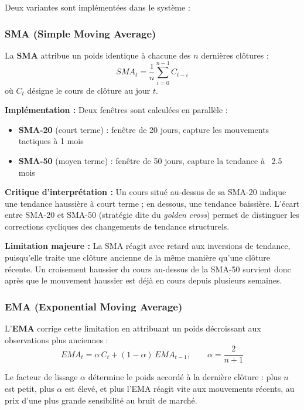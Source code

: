 \documentclass{rapportENSIAS} %
\begin{document}
\vspace{0.2cm}
\noindent
Deux variantes sont implémentées dans le système :

\subsubsection*{SMA (Simple Moving Average)}

\noindent
La \textbf{SMA} attribue un poids identique à chacune des $n$ dernières clôtures :
\[
SMA_t = \frac{1}{n}\sum_{i=0}^{n-1} C_{t-i}
\]
où $C_t$ désigne le cours de clôture au jour $t$.

\vspace{0.2cm}
\noindent
\textbf{Implémentation :} Deux fenêtres sont calculées en parallèle :
\begin{itemize}
    \item \textbf{SMA-20} (court terme) : fenêtre de 20 jours, capture les mouvements tactiques à 1 mois
    \item \textbf{SMA-50} (moyen terme) : fenêtre de 50 jours, capture la tendance à ~2.5 mois
\end{itemize}

\vspace{0.2cm}
\noindent
\textbf{Critique d'interprétation :} Un cours situé au-dessus de sa SMA-20 indique une tendance haussière à court terme ; en dessous, une tendance baissière. L'écart entre SMA-20 et SMA-50 (stratégie dite du \textit{golden cross}) permet de distinguer les corrections cycliques des changements de tendance structurels.

\vspace{0.2cm}
\noindent
\textbf{Limitation majeure :} La SMA réagit avec retard aux inversions de tendance, puisqu'elle traite une clôture ancienne de la même manière qu'une clôture récente. Un croisement haussier du cours au-dessus de la SMA-50 survient donc après que le mouvement haussier est déjà en cours depuis plusieurs semaines.

\subsubsection*{EMA (Exponential Moving Average)}

\noindent
L'\textbf{EMA} corrige cette limitation en attribuant un poids décroissant aux observations plus anciennes :
\[
EMA_t = \alpha\, C_t + (1-\alpha)\, EMA_{t-1}, \qquad \alpha = \frac{2}{n+1}
\]

\noindent
Le facteur de lissage $\alpha$ détermine le poids accordé à la dernière clôture : plus $n$ est petit, plus $\alpha$ est élevé, et plus l'EMA réagit vite aux mouvements récents, au prix d'une plus grande sensibilité au bruit de marché.
\end{document}

